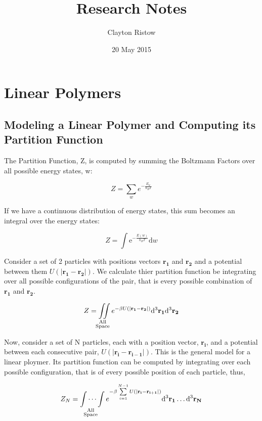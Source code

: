 \documentclass{article}
\title{Research Notes}
\author{Clayton Ristow}
\date{20 May 2015}
\begin{document}
\maketitle

\section{Linear Polymers}
\subsection{Modeling a Linear Polymer and Computing its Partition Function}
The Partition Function, Z, is computed by summing the Boltzmann Factors over all possible energy states, w:

\begin{equation}
Z=\displaystyle\sum_{w}  e^{-\frac{E_w}{k_B T}}
\end{equation}
 
If we have a continuous distribution of energy states, this sum becomes an integral over the energy states:

\begin{equation}
Z=\int \mathrm{e}^{-\frac{E(w)}{k_B T}}\mathrm{d}w
\end{equation}

Consider a set of 2 particles with positions vectors \(\mathbf{r_1}\) and  \(\mathbf{r_2}\) and a potential between them \(U(|\mathbf{r_1-r_2}|)\). We calculate thier partition function be integrating over all possible configurations of the pair, that is every possible combination of \(\mathbf{r_1}\) and  \(\mathbf{r_2}\).

\begin{equation}
Z=\iint\limits_{\substack{\text{All} \\  \text{Space}}}\mathrm\mathrm{e}^{-\beta U(|\mathbf{r_1-r_2}|)}\mathrm{d}^3\mathbf{r_1}\mathrm{d}^{3}\mathbf{r_2}
\end{equation}

Now, consider a set of N particles, each with a position vector, \(\mathbf{r_i}\), and a potential between each consecutive pair, \(U(|\mathbf{r_i-r_{i-1}}|)\). This is the general model for a linear ploymer. Its partition function can be computed by integrating over each possible configuration, that is of every possible position of each particle, thus,

\begin{equation}
Z_N=\idotsint\limits_{\substack{\text{All} \\  \text{Space}}} \mathrm\mathrm{e}^{-\beta\sum\limits_{i=1}^{N-1}U(|\mathbf{r_i-r_{i+1}}|)}\mathrm{d}^3\mathbf{r_1}\dots \mathrm{d}^{3}\mathbf{r_N}
\end{equation}
\end{document}

